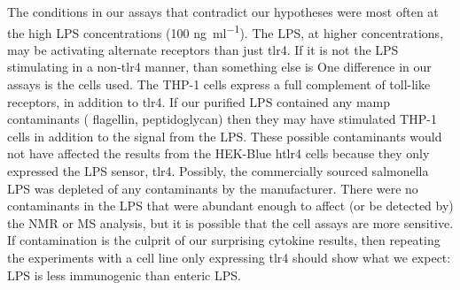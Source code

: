 The conditions in our assays that contradict our hypotheses were most often at
the high \ac{LPS} concentrations (100 \si{\nano\gram\per\milli\litre}). The
\caulobacter \ac{LPS}, at higher concentrations, may be activating alternate receptors than just \ac{tlr4}. If it is not the \ac{LPS} stimulating in a non-\ac{tlr4} manner, than something else is
One difference in our assays is the cells used. The THP-1 cells express a full complement of toll-like receptors, in addition to \ac{tlr4}. If our purified \caulobacter{} \ac{LPS} contained any \ac{mamp}  contaminants (\eg{} flagellin, peptidoglycan) then they may have stimulated THP-1 cells in addition to the signal from the \ac{LPS}. These possible contaminants would not have affected the results from the HEK-Blue h\ac{tlr4} cells because they only expressed the \ac{LPS} sensor, \ac{tlr4}. Possibly, the commercially sourced \ac{salmonella} \ac{LPS} was  depleted of any contaminants by the manufacturer. There were no contaminants in the \caulobacter{} \ac{LPS} that were abundant enough to affect (or be detected by) the \ac{NMR} or \ac{MS} analysis, but it is possible that the cell assays are  more sensitive. If contamination is the culprit of our surprising cytokine results, then repeating the experiments with a cell line only expressing \ac{tlr4} should show what we expect: \caulobacter{} \ac{LPS} is less immunogenic than enteric \ac{LPS}.